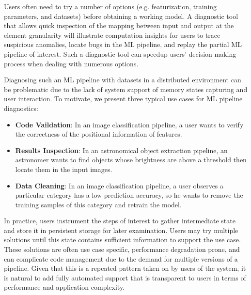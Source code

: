 \documentclass{sig-alternate}
\newenvironment{shortlist}{
        \vspace*{-0.5em}
  \begin{itemize}
  \setlength{\itemsep}{-0.1em}
}{
  \end{itemize}
        \vspace*{-0.5em}
}
\begin{document}
Users often need to try a number of options (e.g. featurization, training parameters, and datasets) before
obtaining a working model. 
A diagnostic tool that allows quick inspection of the mapping between input and output at the element granularity 
will illustrate computation insights for users to trace suspicious anomalies, locate bugs in the ML pipeline, and
replay the partial ML pipeline of interest.
Such a diagnostic tool can speedup users' decision making process when dealing with numerous options.

Diagnosing such an ML pipeline with datasets in a distributed environment can be problematic due to
the lack of system support of memory states capturing and user interaction.
To motivate, we present three typical use cases for ML pipeline diagnostics:
\begin{shortlist}
\item{\bf Code Vaildation}: In an image classification pipeline, a user wants to verify the correctness of 
the positional information of features. 
\item{\bf Results Inspection}: In an astronomical object extraction pipeline, an astronomer wants to find objects whose
brightness are above a threshold then locate them in the input images.
\item{\bf Data Cleaning}: In an image classification pipeline, a user observes a particular category has
a low prediction accuracy, so he wants to remove the training samples of this category and retrain
the model.
\end{shortlist}

In practice, users instrument the steps of interest to gather intermediate state and store it in persistent storage
for later examination. Users may try multiple solutions until this state contains sufficient information to support the
use case. These solutions are often use case specific, performance degradation prone, and can complicate code
management due to the demand for multiple versions of a pipeline.
Given that this is a repeated pattern taken on by users of the system, it is natural to add fully automated support 
that is transparent to users in terms of performance and application complexity.
\end{document}
